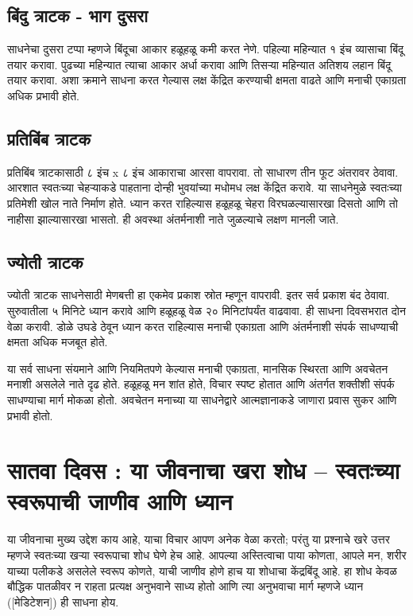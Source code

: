 \subsection*{बिंदु त्राटक - भाग दुसरा}
साधनेचा दुसरा टप्पा म्हणजे बिंदूचा आकार हळूहळू कमी करत नेणे. पहिल्या महिन्यात १ इंच व्यासाचा बिंदू तयार करावा. पुढच्या महिन्यात त्याचा आकार अर्धा करावा आणि तिसऱ्या महिन्यात अतिशय लहान बिंदू तयार करावा. अशा क्रमाने साधना करत गेल्यास लक्ष केंद्रित करण्याची क्षमता वाढते आणि मनाची एकाग्रता अधिक प्रभावी होते.

\subsection*{प्रतिबिंब त्राटक}
प्रतिबिंब त्राटकासाठी ८ इंच x ८ इंच आकाराचा आरसा वापरावा. तो साधारण तीन फूट अंतरावर ठेवावा. आरशात स्वतःच्या चेहऱ्याकडे पाहताना दोन्ही भुवयांच्या मधोमध लक्ष केंद्रित करावे. या साधनेमुळे स्वतःच्या प्रतिमेशी खोल नाते निर्माण होते. ध्यान करत राहिल्यास हळूहळू चेहरा विरघळल्यासारखा दिसतो आणि तो नाहीसा झाल्यासारखा भासतो. ही अवस्था अंतर्मनाशी नाते जुळल्याचे लक्षण मानली जाते.

\subsection*{ज्योती त्राटक}
ज्योती त्राटक साधनेसाठी मेणबत्ती हा एकमेव प्रकाश स्रोत म्हणून वापरावी. इतर सर्व प्रकाश बंद ठेवावा. सुरुवातीला ५ मिनिटे ध्यान करावे आणि हळूहळू वेळ २० मिनिटांपर्यंत वाढवावा. ही साधना दिवसभरात दोन वेळा करावी. डोळे उघडे ठेवून ध्यान करत राहिल्यास मनाची एकाग्रता आणि अंतर्मनाशी संपर्क साधण्याची क्षमता अधिक मजबूत होते.

या सर्व साधना संयमाने आणि नियमितपणे केल्यास मनाची एकाग्रता, मानसिक स्थिरता आणि अवचेतन मनाशी असलेले नाते दृढ होते. हळूहळू मन शांत होते, विचार स्पष्ट होतात आणि अंतर्गत शक्तीशी संपर्क साधण्याचा मार्ग मोकळा होतो. अवचेतन मनाच्या या साधनेद्वारे आत्मज्ञानाकडे जाणारा प्रवास सुकर आणि प्रभावी होतो.


\section*{सातवा दिवस : या जीवनाचा खरा शोध – स्वतःच्या स्वरूपाची जाणीव आणि ध्यान}
या जीवनाचा मुख्य उद्देश काय आहे, याचा विचार आपण अनेक वेळा करतो; परंतु या प्रश्नाचे खरे उत्तर म्हणजे स्वतःच्या खऱ्या स्वरूपाचा शोध घेणे हेच आहे. आपल्या अस्तित्वाचा पाया कोणता, आपले मन, शरीर याच्या पलीकडे असलेले स्वरूप कोणते, याची जाणीव होणे हाच या शोधाचा केंद्रबिंदू आहे. हा शोध केवळ बौद्धिक पातळीवर न राहता प्रत्यक्ष अनुभवाने साध्य होतो आणि त्या अनुभवाचा मार्ग म्हणजे ध्यान ([मेडिटेशन]) ही साधना होय.

